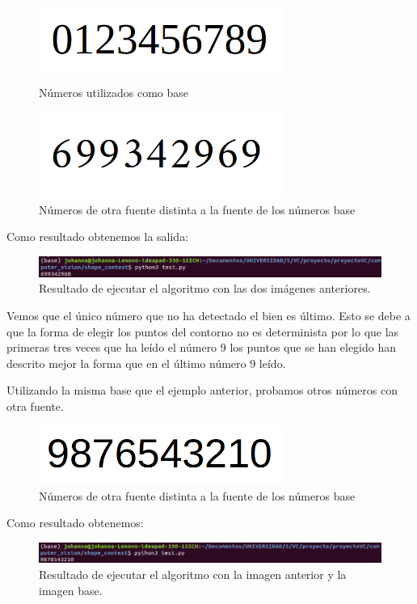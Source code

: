 \documentclass[size=a4, parskip=half, titlepage=false, toc=flat, toc=bib, 12pt]{scrartcl}
\begin{document}
\begin{figure}[H]
\centering
\includegraphics[width=8cm]{./img/base}
\caption{Números utilizados como base}
\includegraphics[width=8cm]{./img/telefono}
\caption{Números de otra fuente distinta a la fuente de los números base}
\end{figure}

Como resultado obtenemos la salida:

\begin{figure}[H]
\centering
\includegraphics[width=15cm]{./img/restelefono}
\caption{Resultado de ejecutar el algoritmo con las dos imágenes anteriores.}
\end{figure}

Vemos que el único número que no ha detectado el bien es último. Esto se debe a que la forma de elegir los puntos del contorno no es determinista por lo que las primeras tres veces que ha leído el número 9 los puntos que se han elegido han descrito mejor la forma que en el último número 9 leído.

Utilizando la misma base que el ejemplo anterior, probamos otros números con otra fuente.
\begin{figure}[H]
\centering
\includegraphics[width=8cm]{./img/otrafuente}
\caption{Números de otra fuente distinta a la fuente de los números base}
\end{figure}
Como resultado obtenemos:

\begin{figure}[H]
\centering
\includegraphics[width=15cm]{./img/resotra}
\caption{Resultado de ejecutar el algoritmo con la imagen anterior y la imagen base.}
\end{figure}
\end{document}
